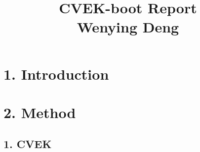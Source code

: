 \documentclass[11pt]{article}
\begin{document}
\setlength{\parindent}{0pt}

\title{CVEK-boot Report\\Wenying Deng \vspace{-1ex}}

\pretitle{\begin{flushright}\normalsize}
\posttitle{\par\end{flushright}}
\author{}
\date{}
\vspace{-10em}
\maketitle
\vspace{-8em}

\vspace{6em}
\section*{{\bf 1. Introduction}}
\section*{{\bf 2. Method}}
\subsection*{{1. CVEK}}
\setcounter{equation}{0}
\renewcommand{\theequation}{1.1.\arabic{equation}}
\end{document}
